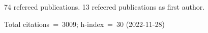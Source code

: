 74 refereed publications. 13 refeered publications as first author.

Total citations~=~3009; h-index~=~30 (2022-11-28)
